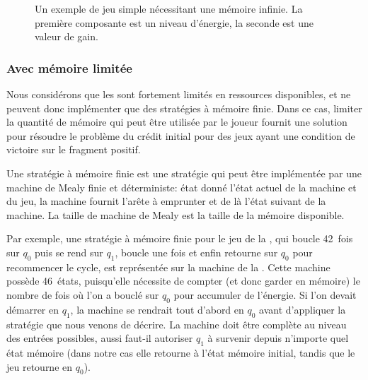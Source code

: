 \begin{figure}[ht]
\centering
{}
\caption[Un exemple de jeu simple nécessitant une mémoire infinie.]{Un exemple de jeu simple nécessitant une mémoire infinie. La première composante est un niveau d'énergie, la seconde est une valeur de gain.}%
\label{tj:fig:infmemoryneeded}
\end{figure}

\subsubsection{Avec mémoire limitée}

Nous considérons que les \rcsfs sont fortement limités en ressources disponibles, et ne peuvent donc implémenter que des stratégies à mémoire finie.
Dans ce cas, limiter \apriori la quantité de mémoire qui peut être utilisée par le joueur fournit une solution pour résoudre le problème du crédit initial pour des jeux ayant une condition de victoire sur le fragment positif.

Une stratégie à mémoire finie est une stratégie qui peut être implémentée par une machine de Mealy finie et déterministe: état donné l'état actuel de la machine et du jeu, la machine fournit l'arête à emprunter et de là l'état suivant de la machine.
La taille de machine de Mealy est la taille de la mémoire disponible.

Par exemple, une stratégie à mémoire finie pour le jeu de la , qui boucle 42~fois sur $q_0$ puis se rend sur $q_1$, boucle une fois et enfin retourne sur $q_0$ pour recommencer le cycle, est représentée sur la machine de la .
Cette machine possède 46~états, puisqu'elle nécessite de compter (et donc garder en mémoire) le nombre de fois où l'on a bouclé sur $q_0$ pour accumuler de l'énergie.
Si l'on devait démarrer en $q_1$, la machine se rendrait tout d'abord en $q_0$ avant d'appliquer la stratégie que nous venons de décrire.
La machine doit être complète au niveau des entrées possibles, aussi faut-il autoriser $q_1$ à survenir depuis n'importe quel état mémoire (dans notre cas elle retourne à l'état mémoire initial, tandis que le jeu retourne en $q_0$).

